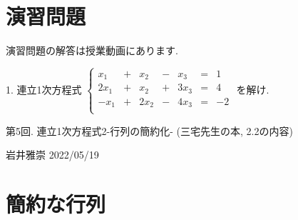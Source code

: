 \documentclass[dvipdfmx,a4paper,11pt]{article}
\theoremstyle{definition}
\begin{document}
 
 
\section{演習問題}
演習問題の解答は授業動画にあります.

1. 連立1次方程式
 $
 \left\{ 
\begin{matrix}
x_1&+&x_2& -&x_3 &= & 1\\
2x_1&+&x_2& +&3x_3&= &4 \\
-x_1&+&2x_2& -&4x_3 &= &-2 \\
\end{matrix}
\right.
 $
 を解け.


\newpage

\begin{center}
{\Large 第5回. 連立1次方程式2-行列の簡約化- (三宅先生の本, 2.2の内容)}
\end{center}

\begin{flushright}
 岩井雅崇 2022/05/19
\end{flushright}

\section{簡約な行列}
\end{document}
